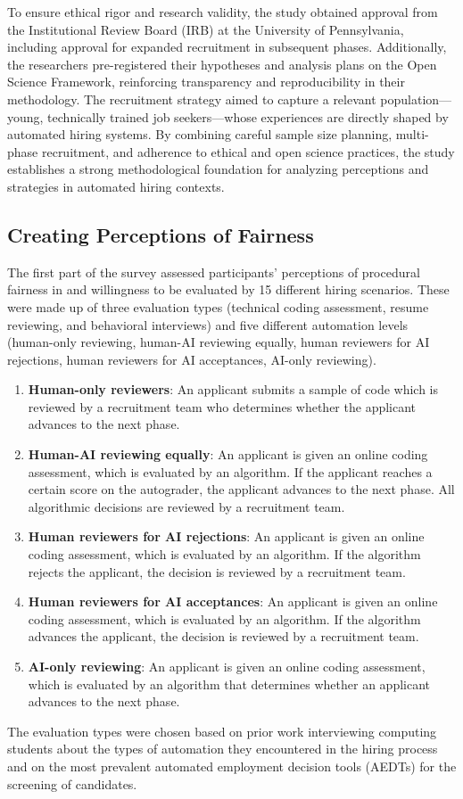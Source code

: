 To ensure ethical rigor and research validity, the study obtained approval from the Institutional Review Board (IRB) at the University of Pennsylvania, including approval for expanded recruitment in subsequent phases. Additionally, the researchers pre-registered their hypotheses and analysis plans on the Open Science Framework, reinforcing transparency and reproducibility in their methodology. The recruitment strategy aimed to capture a relevant population—young, technically trained job seekers—whose experiences are directly shaped by automated hiring systems. By combining careful sample size planning, multi-phase recruitment, and adherence to ethical and open science practices, the study establishes a strong methodological foundation for analyzing perceptions and strategies in automated hiring contexts.

\subsection{Creating Perceptions of Fairness}
The first part of the survey assessed participants' perceptions of procedural fairness in and willingness to be evaluated by 15 different hiring scenarios. These were made up of three evaluation types (technical coding assessment, resume reviewing, and behavioral interviews) and five different automation levels (human-only reviewing, human-AI reviewing equally, human reviewers for AI rejections, human reviewers for AI acceptances, AI-only reviewing).
\begin{enumerate}
    \item \textbf{Human-only reviewers}: An applicant submits a sample of code which is reviewed by a recruitment team who determines whether the applicant advances to the next phase.
    \item \textbf{Human-AI reviewing equally}: An applicant is given an online coding assessment, which is evaluated by an algorithm. If the applicant reaches a certain score on the autograder, the applicant advances to the next phase. All algorithmic decisions are reviewed by a recruitment team.
    \item \textbf{Human reviewers for AI rejections}: An applicant is given an online coding assessment, which is evaluated by an algorithm. If the algorithm rejects the applicant, the decision is reviewed by a recruitment team.
    \item \textbf{Human reviewers for AI acceptances}: An applicant is given an online coding assessment, which is evaluated by an algorithm. If the algorithm advances the applicant, the decision is reviewed by a recruitment team.
    \item \textbf{AI-only reviewing}: An applicant is given an online coding assessment, which is evaluated by an algorithm that determines whether an applicant advances to the next phase.
\end{enumerate}
The evaluation types were chosen based on prior work interviewing computing students about the types of automation they encountered in the hiring process \cite{4_armstrong2023navigating} and on the most prevalent automated employment decision tools (AEDTs) for the screening of candidates.

